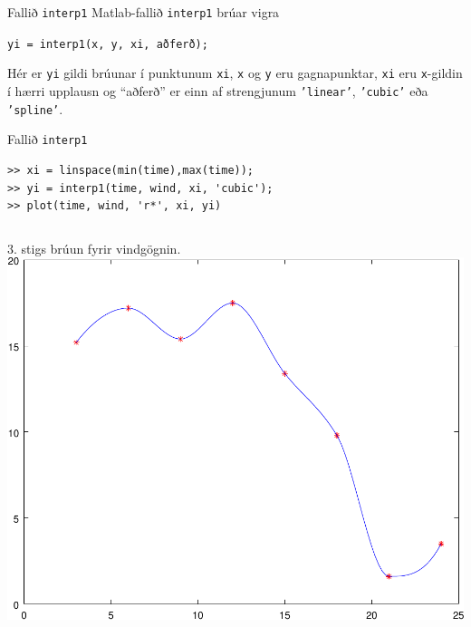 \documentclass{beamer}
\begin{document}
\begin{frame}[fragile]{Fallið \texttt{interp1}}
Matlab-fallið \texttt{interp1} brúar vigra
\begin{center}
\texttt{yi = interp1(x, y, xi, aðferð);}
\end{center}
Hér er \texttt{yi} gildi brúunar í punktunum \texttt{xi}, \texttt{x} og \texttt{y} eru gagnapunktar, \texttt{xi} eru \texttt{x}-gildin í hærri upplausn og ``aðferð'' er einn af strengjunum \texttt{'linear'}, \texttt{'cubic'} eða \texttt{'spline'}.
\end{frame}

\begin{frame}[fragile]{Fallið \texttt{interp1}}
\vspace{1cm}
\begin{verbatim}
>> xi = linspace(min(time),max(time));
>> yi = interp1(time, wind, xi, 'cubic');
>> plot(time, wind, 'r*', xi, yi)
\end{verbatim}
\begin{columns}
3. stigs brúun fyrir vindgögnin.
\includegraphics[width=\linewidth]{Pics/interp1-plot}
\end{columns}
\end{frame}
\end{document}
